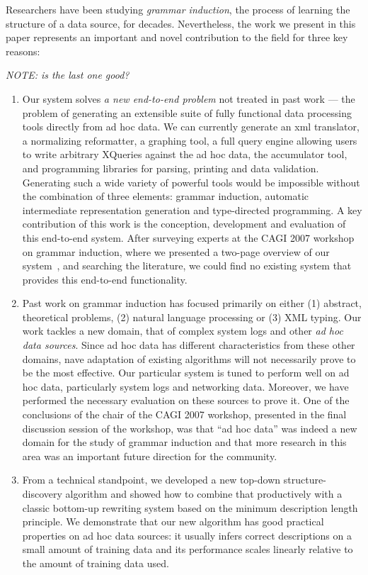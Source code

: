 Researchers have been studying {\em grammar induction}, the process of
learning the structure of a data source, for decades.  Nevertheless,
the work we present in this paper represents an important and novel 
contribution to the field for three key reasons:

{\em NOTE: is the last one good?}

\begin{enumerate}
\item Our system solves {\em a new end-to-end problem} not treated in
past work --- the problem of generating an extensible suite of fully
functional data processing tools directly from ad hoc data.  We can
currently generate an xml translator, a normalizing reformatter, a
graphing tool, a full query engine allowing users to write arbitrary XQueries
against the ad hoc data, the accumulator tool, and
programming libraries for parsing, printing and data validation.
Generating such a wide variety of powerful tools would be impossible
without the combination of three elements: grammar induction,
automatic intermediate representation generation and type-directed
programming.  A key contribution of this work is the conception,
development and evaluation of this end-to-end system.  After surveying
experts at the CAGI 2007 workshop on grammar induction, where we
presented a two-page overview of our system~\cite{burke+:cagi07}, and
searching the literature, we could find no existing system that
provides this end-to-end functionality.

\item Past work on grammar induction has focused primarily on
either (1) abstract, theoretical problems, (2) natural language processing or
(3) XML typing.  Our work tackles a new domain, that of complex system
logs and other {\em ad hoc data sources}. 
Since ad hoc data has different characteristics from these 
other domains, nave adaptation of existing algorithms 
will not necessarily prove to be the most effective.  Our particular
system is tuned to perform well on ad hoc data, particularly system
logs and networking data.  Moreover, we have performed the necessary evaluation
on these sources to prove it.  One of the conclusions of the
chair of the CAGI 2007 workshop, presented in the final discussion session
of the workshop, was that ``ad hoc data'' was indeed a new domain for the 
study of grammar induction and that more research in this area was an
important future direction for the community.

\item  From a technical standpoint, we developed a new top-down 
structure-discovery algorithm and showed how to combine that 
productively with a classic bottom-up rewriting system based on 
the minimum description length principle. We demonstrate that our
new algorithm has good practical properties on ad hoc data sources:  
it usually infers correct descriptions on a small amount of training
data and its performance scales linearly relative to the amount of training
data used.
\end{enumerate}

